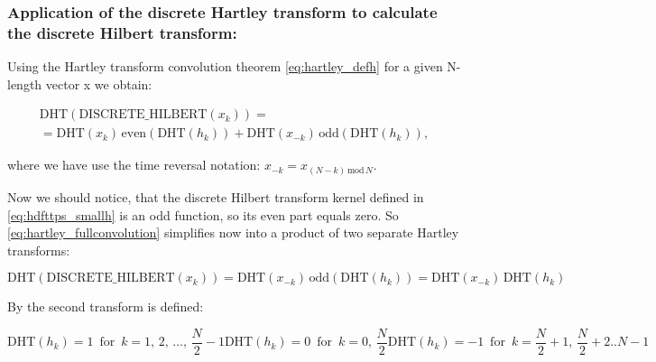\documentclass[12pt,twoside,a4paper]{article}
\numberwithin{equation}{subsection}
\numberwithin{figure}{subsection}
\begin{document}
\subsubsection*{Application of the discrete Hartley transform to calculate the discrete Hilbert transform:}

Using the Hartley transform convolution theorem \ref{eq:hartley_defh} for a given N-length vector x we obtain:

\begin{multline} \label{eq:hartley_fullconvolution}
         \mathrm{DHT}(\mathrm{DISCRETE\_HILBERT}(x_k))  
  = \\ = \mathrm{DHT}(x_{k})   \, \mathrm{even}(\mathrm{DHT}(h_k)) 
       + \mathrm{DHT}(x_{- k}) \, \mathrm{odd} (\mathrm{DHT}(h_k)),
\end{multline} 

where we have use the time reversal notation: $ x_{ - k} = x_{(N - k) \, \mathrm{mod} \, N}$.

Now we should notice, that the discrete Hilbert transform kernel defined in \ref{eq:hdfttps_smallh} is an odd function, so its even
part equals zero. So \ref{eq:hartley_fullconvolution} simplifies now into a product of two separate Hartley transforms:

\begin{equation} \label{eq:hartley_simpleconvolution}
  \mathrm{DHT}(\mathrm{DISCRETE\_HILBERT}(x_k))=\mathrm{DHT}(x_{ - k})\,\mathrm{odd}(\mathrm{DHT}(h_k)) =
  \mathrm{DHT}(x_{- k})\,\mathrm{DHT}(h_k)
\end{equation}

By \cite{chang_computation} the second transform is defined:

\begin{subequations} \label{eq:hartley_strans} 
  \begin{equation}   \label{eq:hstrans_fhalf}
    \mathrm{DHT}(h_k) =  1 \, \mbox{ for } \, k = 1, \, 2, \, \ldots, \, \frac {N}{2} - 1
  \end{equation}
  \begin{equation}   \label{eq:hstrans_middle}
    \mathrm{DHT}(h_k) =  0 \, \mbox{ for } \, k = 0, \, \frac {N}{2}
  \end{equation}
  \begin{equation}   \label{eq:hstrans_shalf}
    \mathrm{DHT}(h_k) = -1 \, \mbox{ for } \, k = \frac {N}{2} + 1, \, \frac {N}{2} + 2 .. N - 1
  \end{equation}
\end{subequations}
\end{document}
